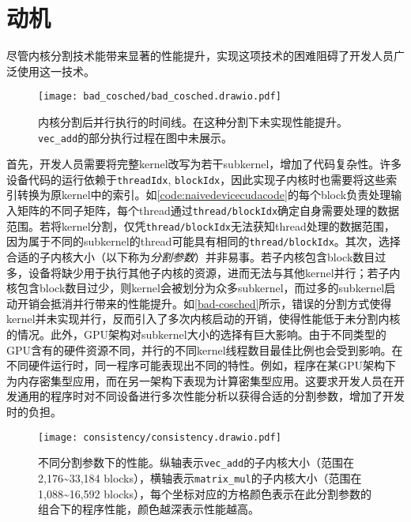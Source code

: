 \section{动机}\label{sec:motivation}

尽管内核分割技术能带来显著的性能提升，实现这项技术的困难阻碍了开发人员广泛使用这一技术。

\begin{figure}[htbp]
    \centering
    \texttt{[image: bad\_cosched/bad\_cosched.drawio.pdf]}
    \caption{内核分割后并行执行的时间线。在这种分割下未实现性能提升。\texttt{vec\_add}的部分执行过程在图中未展示。}
    \label{bad-cosched}    
\end{figure}

首先，开发人员需要将完整kernel改写为若干subkernel，增加了代码复杂性。许多设备代码的运行依赖于\texttt{threadIdx}, \texttt{blockIdx}，因此实现子内核时也需要将这些索引转换为原kernel中的索引。如\autoref{code:naivedevicecudacode}的每个block负责处理输入矩阵的不同子矩阵，每个thread通过\texttt{thread/blockIdx}确定自身需要处理的数据范围。若将kernel分割，仅凭\texttt{thread/blockIdx}无法获知thread处理的数据范围，因为属于不同的subkernel的thread可能具有相同的\texttt{thread/blockIdx}。其次，选择合适的子内核大小（以下称为\emph{分割参数}）并非易事。若子内核包含block数目过多，设备将缺少用于执行其他子内核的资源，进而无法与其他kernel并行；若子内核包含block数目过少，则kernel会被划分为众多subkernel，而过多的subkernel启动开销会抵消并行带来的性能提升。如\autoref{bad-cosched}所示，错误的分割方式使得kernel并未实现并行，反而引入了多次内核启动的开销，使得性能低于未分割内核的情况。此外，GPU架构对subkernel大小的选择有巨大影响。由于不同类型的GPU含有的硬件资源不同，并行的不同kernel线程数目最佳比例也会受到影响。在不同硬件运行时，同一程序可能表现出不同的特性\cite{10.1145/1498765.1498785}\cite{KONSTANTINIDIS201737}。例如，程序在某GPU架构下为内存密集型应用，而在另一架构下表现为计算密集型应用。这要求开发人员在开发通用的程序时对不同设备进行多次性能分析以获得合适的分割参数，增加了开发时的负担。

\begin{figure}[htbp]
    \centering
    \texttt{[image: consistency/consistency.drawio.pdf]}
    \caption{不同分割参数下的性能。纵轴表示\texttt{vec\_add}的子内核大小（范围在2,176\textasciitilde 33,184 blocks），横轴表示\texttt{matrix\_mul}的子内核大小（范围在1,088\textasciitilde 16,592 blocks），每个坐标对应的方格颜色表示在此分割参数的组合下的程序性能，颜色越深表示性能越高。}

    \label{consistency}
\end{figure}


